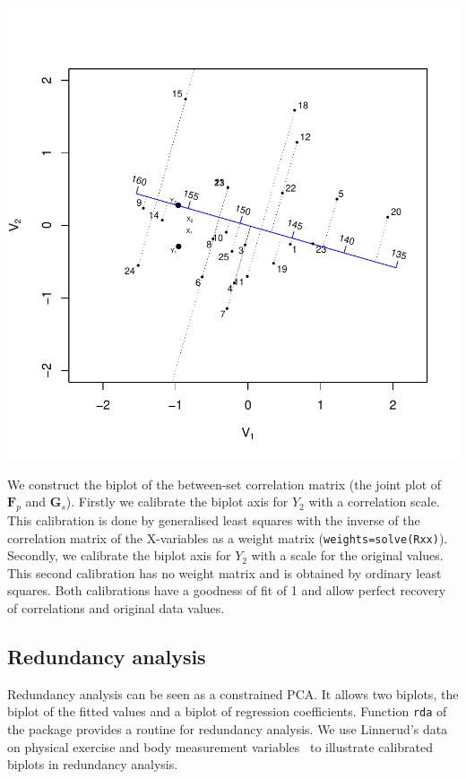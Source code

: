 \documentclass[a4paper]{article}
\newcommand{\bF}{\ensuremath{\mathbf F}}
\newcommand{\bG}{\ensuremath{\mathbf G}}
\begin{document}
\includegraphics{CalibrationGuide-016}

We construct the biplot of the between-set correlation matrix (the joint 
plot of ${\bF}_p$ and ${\bG}_s$). 
Firstly we calibrate the biplot axis for $Y_2$ with a correlation scale.
This calibration is done by generalised least squares with the inverse of the correlation matrix of 
the X-variables as a weight matrix ({\tt weights=solve(Rxx)}). Secondly, we calibrate the biplot axis 
for $Y_2$ with a scale for the original values. This second calibration has no weight 
matrix and is obtained by ordinary least squares. Both calibrations have a goodness of fit of 1 and
allow perfect recovery of correlations and original data values.

\subsection{Redundancy analysis}
\label{sec:rda}

Redundancy analysis can be seen as a constrained PCA. It allows two biplots, the biplot of the fitted
values and a biplot of regression coefficients. Function {\tt rda} of the package provides a routine
for redundancy analysis. We use Linnerud's data on physical exercise and body measurement 
variables~\cite{Tenenhaus} to illustrate calibrated biplots in redundancy analysis.
\end{document}
